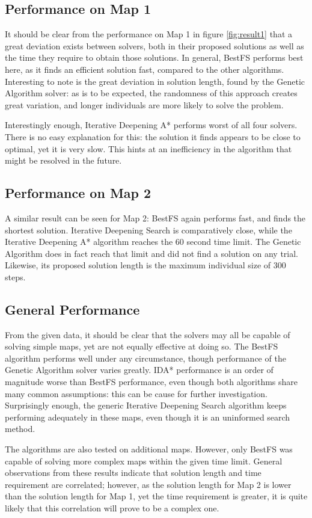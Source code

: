 \subsection{Performance on Map 1}
It should be clear from the performance on Map 1 in figure \ref{fig:result1} that a great deviation exists between solvers, both in their proposed solutions as well as the time they require to obtain those solutions. In general, BestFS performs best here, as it finds an efficient solution fast, compared to the other algorithms. Interesting to note is the great deviation in solution length, found by the Genetic Algorithm solver: as is to be expected, the randomness of this approach creates great variation, and longer individuals are more likely to solve the problem.

Interestingly enough, Iterative Deepening A* performs worst of all four solvers. There is no easy explanation for this: the solution it finds appears to be close to optimal, yet it is very slow. This hints at an inefficiency in the algorithm that might be resolved in the future.

\subsection{Performance on Map 2}
A similar result can be seen for Map 2: BestFS again performs fast, and finds the shortest solution. Iterative Deepening Search is comparatively close, while the Iterative Deepening A* algorithm reaches the 60 second time limit. The Genetic Algorithm does in fact reach that limit and did not find a solution on any trial. Likewise, its proposed solution length is the maximum individual size of 300 steps.

\subsection{General Performance}
From the given data, it should be clear that the solvers may all be capable of solving simple maps, yet are not equally effective at doing so. The BestFS algorithm performs well under any circumstance, though performance of the Genetic Algorithm solver varies greatly. IDA* performance is an order of magnitude worse than BestFS performance, even though both algorithms share many common assumptions: this can be cause for further investigation. Surprisingly enough, the generic Iterative Deepening Search algorithm keeps performing adequately in these maps, even though it is an uninformed search method.

The algorithms are also tested on additional maps. However, only BestFS was capable of solving more complex maps within the given time limit. General observations from these results indicate that solution length and time requirement are correlated; however, as the solution length for Map 2 is lower than the solution length for Map 1, yet the time requirement is greater, it is quite likely that this correlation will prove to be a complex one.




